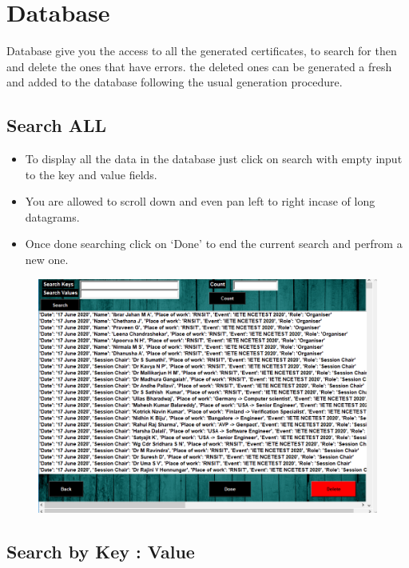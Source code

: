 \chapter{Database}

Database give you the access to all the generated certificates, to search for then and delete the ones that have errors. the deleted ones can be generated a fresh and added to the database following the usual generation procedure.

\section{Search ALL}

\begin{itemize}
\item To display all the data in the database just click on search with empty input to the key and value fields.
\item You are allowed to scroll down and even pan left to right incase of long datagrams.
\item Once done searching click on `Done' to end the current search and perfrom a new one.
\end{itemize}

\begin{figure}[H]
	\centering
	\includegraphics[width=0.95\linewidth]{"images/generation_qr_nqr/Screenshot (68)"}
	\label{fig:screenshot-68}
\end{figure}




\section{Search by Key : Value}

